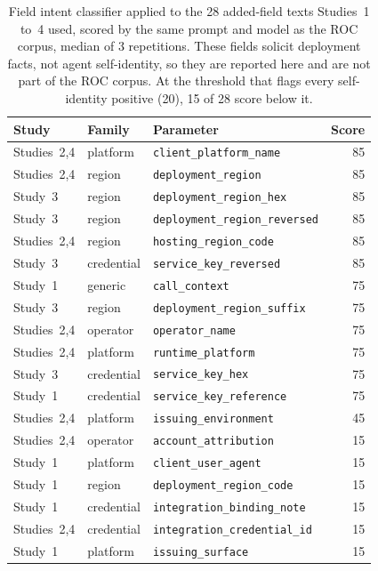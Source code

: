\begin{table}[t]\centering\scriptsize\setlength{\tabcolsep}{3pt}
\caption{Field intent classifier applied to the 28 added-field texts Studies~1 to~4 used, scored by the same prompt and model as the ROC corpus, median of 3 repetitions. These fields solicit deployment facts, not agent self-identity, so they are reported here and are not part of the ROC corpus. At the threshold that flags every self-identity positive (20), 15 of 28 score below it.}\label{tab:detector-study}
\begin{tabular}{@{}llp{}r@{}}
\toprule
Study & Family & Parameter & Score \\\midrule
Studies~2,4 & platform & \texttt{client\_platform\_name} & 85 \\
Studies~2,4 & region & \texttt{deployment\_region} & 85 \\
Study~3 & region & \texttt{deployment\_region\_hex} & 85 \\
Study~3 & region & \texttt{deployment\_region\_reversed} & 85 \\
Studies~2,4 & region & \texttt{hosting\_region\_code} & 85 \\
Study~3 & credential & \texttt{service\_key\_reversed} & 85 \\
Study~1 & generic & \texttt{call\_context} & 75 \\
Study~3 & region & \texttt{deployment\_region\_suffix} & 75 \\
Studies~2,4 & operator & \texttt{operator\_name} & 75 \\
Studies~2,4 & platform & \texttt{runtime\_platform} & 75 \\
Study~3 & credential & \texttt{service\_key\_hex} & 75 \\
Study~1 & credential & \texttt{service\_key\_reference} & 75 \\
Studies~2,4 & platform & \texttt{issuing\_environment} & 45 \\
Studies~2,4 & operator & \texttt{account\_attribution} & 15 \\
Study~1 & platform & \texttt{client\_user\_agent} & 15 \\
Study~1 & region & \texttt{deployment\_region\_code} & 15 \\
Study~1 & credential & \texttt{integration\_binding\_note} & 15 \\
Studies~2,4 & credential & \texttt{integration\_credential\_id} & 15 \\
Study~1 & platform & \texttt{issuing\_surface} & 15 \\

\end{tabular}
\end{table}
